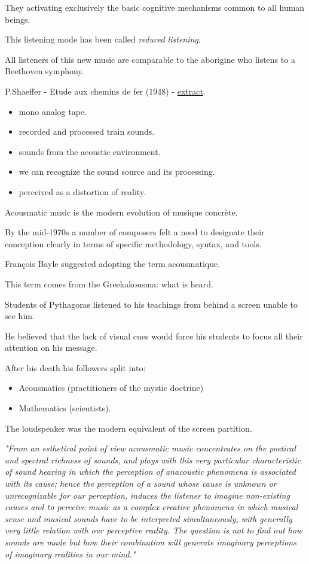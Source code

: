 They activating exclusively the basic cognitive mechanisms common to all human beings.

This listening mode has been called \textit{reduced listening}.

All listeners of this new music are comparable to the aborigine who listens to a Beethoven symphony.

P.Shaeffer - Etude aux chemins de fer (1948) - \href{suoni/shaeffer.mp3}{extract}.

\begin{itemize}
\tightlist
\item mono analog tape.
\item recorded and processed train sounds.
\item sounds from the acoustic environment.
\item we can recognize the sound source and its processing.
\item perceived as a distortion of reality.
\end{itemize}

Acousmatic music is the modern evolution of musique concrète.

By the mid-1970s a number of composers felt a need to designate their conception clearly in terms of specific methodology, syntax, and tools.

François Bayle suggested adopting the term acousmatique.

This term comes from the Greekakousma: what is heard.

Students of Pythagoras listened to his teachings from behind a screen unable to see him.

He believed that the lack of visual cues would force his students to focus all their attention on his message.

After his death his followers split into:

\begin{itemize}
\tightlist
\item Acousmatics (practitioners of the mystic doctrine)
\item Mathematics (scientists).
\end{itemize}

The loudspeaker was the modern equivalent of the screen partition.

\textit{"From an esthetical point of view acousmatic music concentrates on the poetical and spectral richness of sounds, and plays with this very particular characteristic of sound hearing in which the perception of anacoustic phenomena is associated with its cause; hence the perception of a sound whose cause is unknown or unrecognizable for our perception, induces the listener to imagine non-existing causes and to perceive
music as a complex creative phenomena in which musical sense and musical sounds have to be interpreted simultaneously, with generally very little relation with our perceptive reality. The question is not to find out how sounds are made but how their combination will generate imaginary perceptions of imaginary realities in our mind."}

